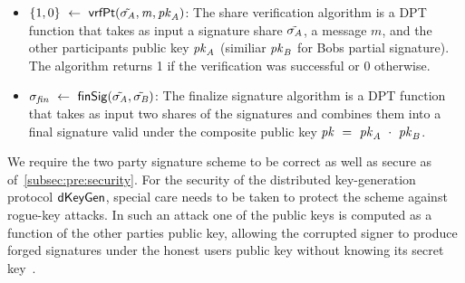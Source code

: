 \begin{definition}
\begin{itemize}
        \item $\{1,0\} ~\leftarrow~ \mathsf{vrfPt}(\tilde{\sigma_{\mathit{A}}}, \mathit{m}, \mathit{pk}_{\mathit{A}})$: The share verification algorithm is a DPT function that takes as input a signature share $\tilde{\sigma_{\mathit{A}}}$, a message $m$, and the other participants public key $\mathit{pk}_{\mathit{A}}$ (similiar $\mathit{pk}_{\mathit{B}}$ for Bobs partial signature).
        The algorithm returns 1 if the verification was successful or 0 otherwise.

        \item $\sigma_{\mathit{fin}} ~\leftarrow~ \mathsf{finSig}(\tilde{\sigma_{\mathit{A}}}, \tilde{\sigma_{\mathit{B}}})$: The finalize signature algorithm is a DPT function that takes as input two shares of the signatures and combines them into a final signature valid under the composite public key $\mathit{pk} ~=~ \mathit{pk}_{\mathit{A}} ~\cdot~ \mathit{pk}_{\mathit{B}}$.

    \end{itemize}

\end{definition}

We require the two party signature scheme to be correct as well as secure as of~\cref{subsec:pre:security}.
For the security of the distributed key-generation protocol $\mathsf{dKeyGen}$, special care needs to be taken to protect the scheme against rogue-key attacks.
In such an attack one of the public keys is computed as a function of the other parties public key, allowing the corrupted signer to produce forged signatures under the honest users public key without knowing its secret key~\cite{maxwell2019simple}.


